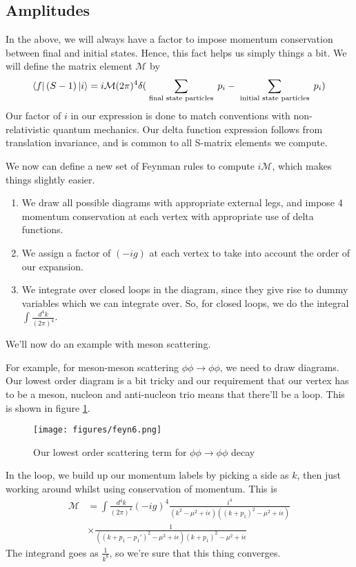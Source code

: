 \subsection{Amplitudes} 
In the above, we will always have a factor 
to impose momentum conservation 
between final and initial states. Hence, 
this fact helps us simply things a bit. 
We will define the matrix element $ \mathcal{ M } $ by 
\[
\bra { f} ( S - 1 ) \ket{ i }  = i \mathcal{ M } ( 2 \pi ) ^ 4 \delta ( \sum_{ \text{ final state particles }}  p_i  - \sum_{ \text{ initial state particles }} p_ i ) 
\] Our factor of $ i  $ in our expression 
is done to match conventions with non-relativistic quantum mechanics. 
Our delta function expression follows from translation invariance, and 
is common to all S-matrix elements we compute. 

We now can define a new set of Feynman rules to compute $ i \mathcal{ M  }$, 
which makes things slightly easier. 
\begin{enumerate}
\item We draw all possible diagrams with appropriate external legs, 
and impose 4 momentum conservation at each vertex with appropriate use of delta functions. 
\item We assign a factor of $ ( - ig) $ at each vertex to take into account 
the order of our expansion. 
\item We integrate over closed loops in the diagram, since they give rise
to dummy variables which we can integrate over. So, for closed loops, we 
do the integral $ \int \frac{d^ 4 k }{ ( 2 \pi ) ^ 4 }$. 
\end{enumerate}

We'll now do an example with meson scattering. 

For example, for meson-meson scattering $ \phi \phi \to \phi \phi $, 
we need to draw diagrams. Our lowest order diagram is 
a bit tricky and our requirement that our vertex has to be a 
meson, nucleon and anti-nucleon trio 
means that there'll be a loop. This is shown in figure \ref{fig:mesonLoop}. 

\begin{figure}[htpb]
\centering
\texttt{[image: figures/feyn6.png]}
\caption{Our lowest order scattering term for $ \phi \phi \to \phi \phi $ decay}%
\label{fig:mesonLoop}
\end{figure}
In the loop, we build up our momentum labels by picking a side as $ k$, 
then just working around whilst using conservation 
of momentum.
This is
\begin{align*} 
\mathcal{ M }  &= \int \frac{ d^ 4 k  }{ ( 2 \pi ) ^ 4  }( - i g ) ^ 4 \frac{i ^ 4 }{ ( k ^ 2 - \mu ^ 2 + i \epsilon ) ( ( k + p_1 ) ^ 2  - \mu ^ 2 + i \epsilon )} \\
	       & \times \frac{1}{( ( k + p_1  - p_1' ) ^ 2 - \mu ^  2+ i \epsilon ) ( k + p_1 ) ^ 2 - \mu ^ 2 + i \epsilon  }
\end{align*} The integrand goes as $ \frac{1}{ k ^ 8 } $, so 
we're sure that this thing converges. 

\pagebreak
